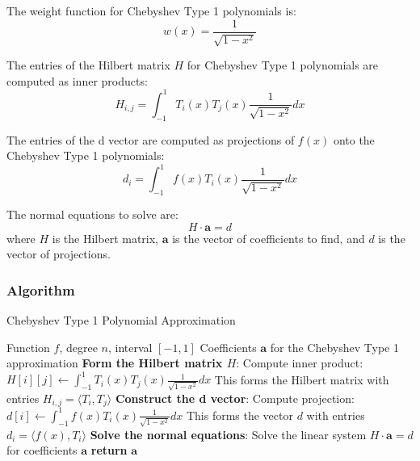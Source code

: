 \documentclass[10pt]{article}
\begin{document}
The weight function for Chebyshev Type 1 polynomials is:
\begin{equation}
w(x) = \frac{1}{\sqrt{1-x^2}}
\end{equation}

The entries of the Hilbert matrix \( H \) for Chebyshev Type 1 polynomials are computed as inner products:
\begin{equation}
H_{i,j} = \int_{-1}^{1} T_i(x) T_j(x) \frac{1}{\sqrt{1-x^2}} dx
\end{equation}

The entries of the d vector are computed as projections of \( f(x) \) onto the Chebyshev Type 1 polynomials:
\begin{equation}
d_i = \int_{-1}^{1} f(x) T_i(x) \frac{1}{\sqrt{1-x^2}} dx
\end{equation}

The normal equations to solve are:
\begin{equation}
H \cdot \mathbf{a} = d
\end{equation}
where \( H \) is the Hilbert matrix, \( \mathbf{a} \) is the vector of coefficients to find, and \( d \) is the vector of projections.

\subsubsection{Algorithm}
\begin{algorithm}[H]
\caption{Chebyshev Type 1 Polynomial Approximation}\label{alg:chebyshev1}
\begin{algorithmic}
\Require Function $f$, degree $n$, interval $[-1, 1]$
\Ensure Coefficients $\mathbf{a}$ for the Chebyshev Type 1 approximation
\State \textbf{Form the Hilbert matrix $H$}:
        \State Compute inner product: $H[i][j] \gets \int_{-1}^{1} T_i(x) T_j(x) \frac{1}{\sqrt{1-x^2}} dx$
        \State This forms the Hilbert matrix with entries $H_{i,j} = \langle T_i, T_j \rangle$
    \EndFor
\EndFor
\State \textbf{Construct the d vector}:
    \State Compute projection: $d[i] \gets \int_{-1}^{1} f(x) T_i(x) \frac{1}{\sqrt{1-x^2}} dx$
    \State This forms the vector $d$ with entries $d_i = \langle f(x), T_i \rangle$
\EndFor
\State \textbf{Solve the normal equations}:
\State Solve the linear system $H \cdot \mathbf{a} = d$ for coefficients $\mathbf{a}$
\State \textbf{return} $\mathbf{a}$
\end{algorithmic}
\end{algorithm}
\end{document}
